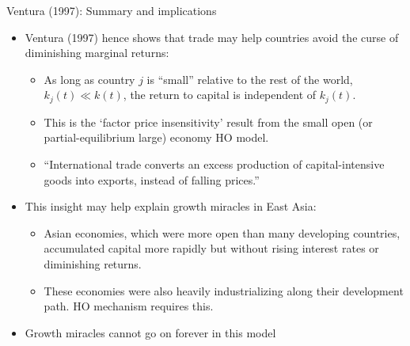 \documentclass[10pt,notes=hide]{beamer}
\begin{document}
\begin{frame}{Ventura (1997): Summary and implications}
\begin{itemize}
\item Ventura (1997) hence shows that trade may help countries avoid the curse of diminishing marginal returns:
	\begin{itemize}
	\item As long as country $j$ is ``small'' relative to the rest of the world, $k_j(t) \ll k(t)$, the return to capital is independent of $k_j(t)$.
	\item This is the `factor price insensitivity' result from the small open (or partial-equilibrium large) economy HO model.
	\item ``International trade converts an excess production of capital-intensive goods into exports, instead of falling prices.''
	\end{itemize}
\item This insight may help explain growth miracles in East Asia:
	\begin{itemize}
	\item Asian economies, which were more open than many developing countries, accumulated capital more rapidly but without rising interest rates or diminishing returns.
	\item These economies were also heavily industrializing along their development path. HO mechanism requires this.
	\end{itemize}
\item Growth miracles cannot go on forever in this model
\end{itemize}
\end{frame}
\end{document}
